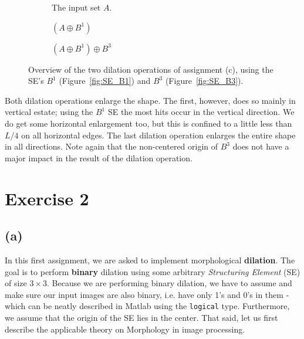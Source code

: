 \documentclass{article}
\begin{document}
\begin{figure}[H]
     \centering
     \begin{subfigure}[b]{0.27\textwidth}
         \centering
         
         \caption{The input set $A$.}
         \label{fig:ex1_c-inputset}
     \end{subfigure}
     \hfill
     \begin{subfigure}[b]{0.29\textwidth}
         \centering
         
         \caption{$(A \oplus B^1)$}
         \label{fig:ex1_c-step1}
     \end{subfigure}
     \hfill
     \begin{subfigure}[b]{0.37\textwidth}
         \centering
         
         \caption{$(A \oplus B^1) \oplus B^3$}
         \label{fig:ex1_c-step2}
     \end{subfigure}
     
    \caption{Overview of the two dilation operations of assignment (c), using the SE's $B^1$ (Figure~\ref{fig:SE_B1}) and $B^3$ (Figure~\ref{fig:SE_B3}).}
    \label{fig:ex1_c}
\end{figure}

Both dilation operations enlarge the shape. The first, however, does so mainly in vertical estate; using the $B^1$ SE the most hits occur in the vertical direction. We do get some horizontal enlargement too, but this is confined to a little less than $L/4$ on all horizontal edges. The last dilation operation enlarges the entire shape in all directions. Note again that the non-centered origin of $B^3$ does not have a major impact in the result of the dilation operation.

\section*{Exercise 2}
\subsection*{(a)}
In this first assignment, we are asked to implement morphological \textbf{dilation}. The goal is to perform \textbf{binary} dilation using some arbitrary \textit{Structuring Element} (SE) of size $3 \times 3$. Because we are performing binary dilation, we have to assume and make sure our input images are also binary, i.e. have only 1's and 0's in them - which can be neatly described in Matlab using the \texttt{logical} type. Furthermore, we assume that the origin of the SE lies in the center. That said, let us first describe the applicable theory on Morphology in image processing.
\end{document}
